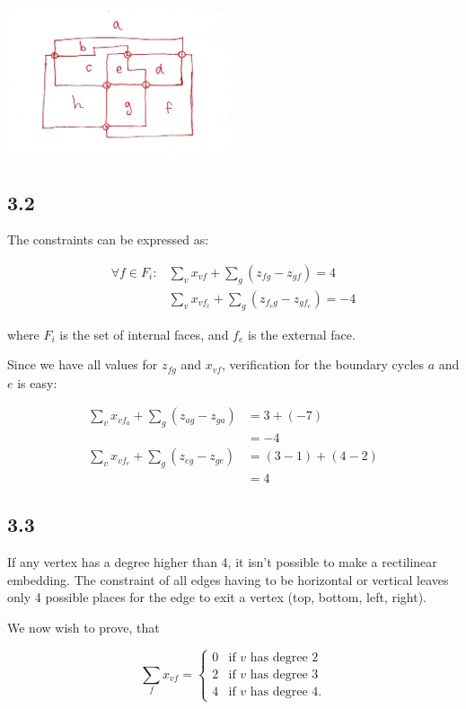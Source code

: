 \documentclass[11pt,a4paper]{article}
\begin{document}
\includegraphics[width=0.5\textwidth]{images/rectilinear-2}

\subsection{3.2}
The constraints can be expressed as:

\begin{align*}
    \forall f \in F_i: &\sum_v x_{vf} + \sum_g (z_{fg} - z_{gf}) = 4 \\
                       &\sum_v x_{vf_e} + \sum_g (z_{f_eg} - z_{gf_e}) = -4
\end{align*}

\noindent where $F_i$ is the set of internal faces, and $f_e$ is the external face. 

Since we have all values for $z_{fg}$ and $x_{vf}$, verification for the boundary cycles
$a$ and $e$ is easy:

\begin{align*}
    \sum_v x_{vf_a} + \sum_g (z_{ag} - z_{ga}) &= 3 + (-7) \\
                                               &= -4 \\
    \sum_v x_{vf_e} + \sum_g (z_{eg} - z_{ge}) &= (3-1) + (4-2) \\
                                               &= 4
\end{align*}

\subsection{3.3}
If any vertex has a degree higher than 4, it isn't possible to make a
rectilinear embedding. The constraint of all edges having to be horizontal or
vertical leaves only 4 possible places for the edge to exit a vertex (top,
bottom, left, right).

We now wish to prove, that

\[
    \sum_f x_{vf} = \begin{cases} 0 & \text{if $v$ has degree $2$} \\
                                      2 & \text{if $v$ has degree $3$} \\
                                      4 & \text{if $v$ has degree $4$.} \end{cases}
\]
\end{document}
